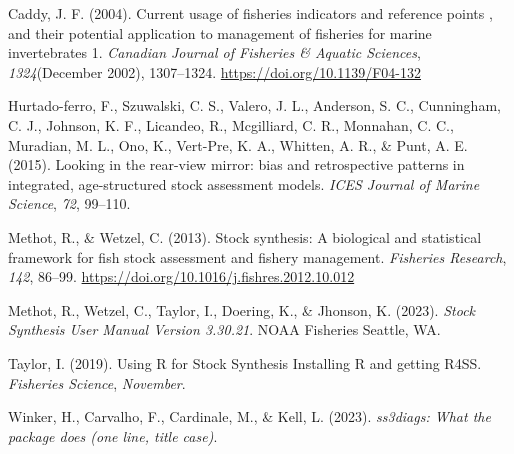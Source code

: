 \documentclass[
]{article}
\newlength{\cslhangindent}
\newlength{\cslentryspacingunit} %
\newenvironment{CSLReferences}[2] %
 {%
  \setlength{\parindent}{0pt}
  \ifodd #1
  \let\oldpar\par
  \def\par{\hangindent=\cslhangindent\oldpar}
  \fi
  \setlength{\parskip}{#2\cslentryspacingunit}
 }%
 {}
\begin{document}
\hypertarget{refs}{}
\begin{CSLReferences}{1}{0}
\leavevmode{}%
Caddy, J. F. (2004). {Current usage of fisheries indicators and reference points , and their potential application to management of fisheries for marine invertebrates 1}. \emph{Canadian Journal of Fisheries {\&} Aquatic Sciences}, \emph{1324}(December 2002), 1307--1324. \url{https://doi.org/10.1139/F04-132}

\leavevmode{}%
Hurtado-ferro, F., Szuwalski, C. S., Valero, J. L., Anderson, S. C., Cunningham, C. J., Johnson, K. F., Licandeo, R., Mcgilliard, C. R., Monnahan, C. C., Muradian, M. L., Ono, K., Vert-Pre, K. A., Whitten, A. R., \& Punt, A. E. (2015). {Looking in the rear-view mirror: bias and retrospective patterns in integrated, age-structured stock assessment models}. \emph{ICES Journal of Marine Science}, \emph{72}, 99--110.

\leavevmode{}%
Methot, R., \& Wetzel, C. (2013). {Stock synthesis: A biological and statistical framework for fish stock assessment and fishery management}. \emph{Fisheries Research}, \emph{142}, 86--99. \url{https://doi.org/10.1016/j.fishres.2012.10.012}

\leavevmode{}%
Methot, R., Wetzel, C., Taylor, I., Doering, K., \& Jhonson, K. (2023). \emph{{Stock Synthesis User Manual Version 3.30.21}}. NOAA Fisheries Seattle, WA.

\leavevmode{}%
Taylor, I. (2019). {Using R for Stock Synthesis Installing R and getting R4SS}. \emph{Fisheries Science}, \emph{November}.

\leavevmode{}%
Winker, H., Carvalho, F., Cardinale, M., \& Kell, L. (2023). \emph{ss3diags: What the package does (one line, title case)}.

\end{CSLReferences}
\end{document}
